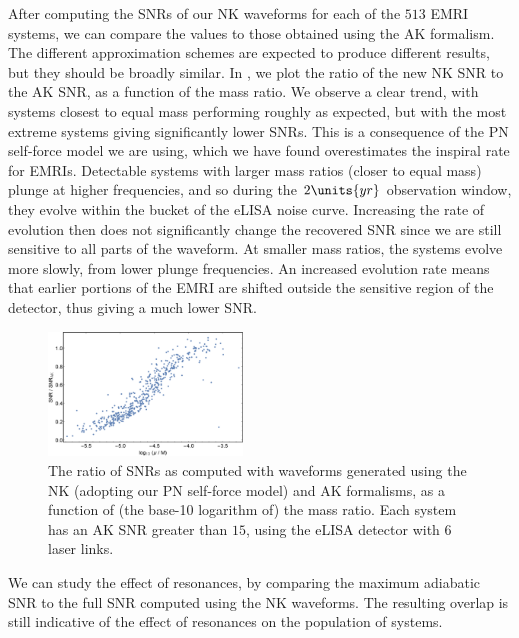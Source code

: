 After computing the SNRs of our NK waveforms for each of the $513$ EMRI systems, we can compare the values to those obtained using the AK formalism. The different approximation schemes are expected to produce different results, but they should be broadly similar. In , we plot the ratio of the new NK SNR to the AK SNR, as a function of the mass ratio. We observe a clear trend, with systems closest to equal mass performing roughly as expected, but with the most extreme systems giving significantly lower SNRs. This is a consequence of the PN self-force model we are using, which we have found overestimates the inspiral rate for EMRIs. Detectable systems with larger mass ratios (closer to equal mass) plunge at higher frequencies, and so during the $2\units{yr}$ observation window, they evolve within the bucket of the eLISA noise curve. Increasing the rate of evolution then does not significantly change the recovered SNR since we are still sensitive to all parts of the waveform. At smaller mass ratios, the systems evolve more slowly, from lower plunge frequencies. An increased evolution rate means that earlier portions of the EMRI are shifted outside the sensitive region of the detector, thus giving a much lower SNR.
\begin{figure}
\centering
\includegraphics[width=0.46\textwidth]{pop_SNR_vs_eta}
\caption{\label{fig:pop-SNR-vs-eta}The ratio of SNRs as computed with waveforms generated using the NK (adopting our PN self-force model) and AK formalisms, as a function of (the base-10 logarithm of) the mass ratio. Each system has an AK SNR greater than $15$, using the eLISA detector with 6 laser links.}
\end{figure}
We can study the effect of resonances, by comparing the maximum adiabatic SNR to the full SNR computed using the NK waveforms. The resulting overlap is still indicative of the effect of resonances on the population of systems.
